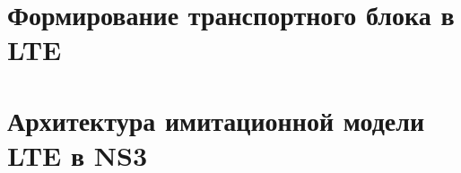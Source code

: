 \appendix
\chapter{Формирование транспортного блока в LTE} \label{AppendixLTEblock}

\clearpage
\chapter{Архитектура имитационной модели LTE в NS3} \label{AppendixNS3}

\clearpage
%
%


